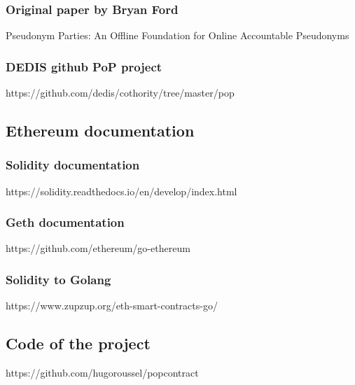 \documentclass[11pt, a4paper, twoside, openright]{book} %
\begin{document}
\subsubsection*{Original paper by Bryan Ford}
Pseudonym Parties: An Offline Foundation for Online Accountable Pseudonyms\\
\subsubsection*{DEDIS github PoP project}
https://github.com/dedis/cothority/tree/master/pop\\
\subsection*{Ethereum documentation}
\subsubsection*{Solidity documentation}
https://solidity.readthedocs.io/en/develop/index.html
\subsubsection*{Geth documentation}
https://github.com/ethereum/go-ethereum
\subsubsection*{Solidity to Golang}
https://www.zupzup.org/eth-smart-contracts-go/
\subsection*{Code of the project}
https://github.com/hugoroussel/popcontract
\end{document}
